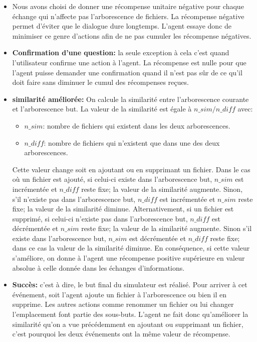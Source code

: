 \begin{itemize}
	\item Nous avons choisi de donner une récompense unitaire négative pour chaque échange qui n'affecte pas l'arborescence de fichiers. La récompense négative permet d'éviter que le dialogue dure longtemps. L'agent essaye donc de minimiser ce genre d'actions afin de ne pas cumuler les récompense négatives.
	\item \textbf{Confirmation d'une question:} la seule exception à cela c'est quand l'utilisateur confirme une action à l'agent. La récompense est nulle pour que l'agent puisse demander une confirmation quand il n'est pas sûr de ce qu'il doit faire sans diminuer le cumul des récompenses reçues.
	\item \textbf{similarité améliorée:} On calcule la similarité entre l'arborescence courante et l'arborescence but. La valeur de la similarité est égale à $n\_sim/n\_diff$ avec: 
	\begin{itemize}
		\item $n\_sim$: nombre de fichiers qui existent dans les deux arborescences.
		\item $n\_diff$: nombre de fichiers qui n'existent que dans une des deux arborescences.  
	\end{itemize}
	Cette valeur change soit en ajoutant ou en supprimant un fichier. Dans le cas où un fichier est ajouté, si celui-ci existe dans l'arborescence but, $n\_sim$ est incrémentée et $n\_diff$ reste fixe; la valeur de la similarité augmente. Sinon, s'il n'existe pas dans l'arborescence but, $n\_diff$ est incrémentée et $n\_sim$ reste fixe; la valeur de la similarité diminue. Alternativement, si un fichier est supprimé, si celui-ci n'existe pas dans l'arborescence but, $n\_diff$ est décrémentée et $n\_sim$ reste fixe; la valeur de la similarité augmente. Sinon s'il existe dans l'arborescence but, $n\_sim$ est décrémentée et $n\_diff$ reste fixe; dans ce cas la valeur de la similarité diminue.
	En conséquence, si cette valeur s'améliore, on donne à l'agent une récompense positive supérieure en valeur absolue à celle donnée dans les échanges d'informations.
	\item \textbf{Succès:} c'est à dire, le but final du simulateur est réalisé. Pour arriver à cet événement, soit l'agent ajoute un fichier à l'arborescence ou bien il en supprime. Les autres actions comme renommer un fichier ou lui changer l'emplacement font partie des sous-buts. L'agent ne fait donc qu'améliorer la similarité qu'on a vue précédemment en ajoutant ou supprimant un fichier, c'est pourquoi les deux événements ont la même valeur de récompense.

\end{itemize}
